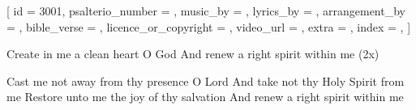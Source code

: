 
[
    id = {3001},
    psalterio_number = {},
    music_by = {},
    lyrics_by = {},
    arrangement_by = {},
    bible_verse = {},
    licence_or_copyright = {},
    video_url = {},
    extra = {},
    index = {},
]


\beginverse
	
Create in me a clean heart O God
And renew a right spirit within me (2x)

\endverse


\beginchorus

Cast me not away from thy presence O Lord
And take not thy Holy Spirit from me
Restore unto me the joy of thy salvation
And renew a right spirit within me

\endchorus





\endsong
